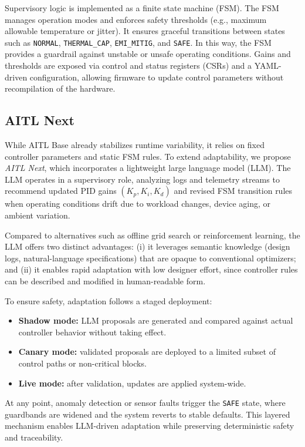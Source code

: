 \documentclass[conference]{IEEEtran}
\begin{document}
Supervisory logic is implemented as a finite state machine (FSM). The FSM manages operation modes and enforces safety thresholds (e.g., maximum allowable temperature or jitter). It ensures graceful transitions between states such as \texttt{NORMAL}, \texttt{THERMAL\_CAP}, \texttt{EMI\_MITIG}, and \texttt{SAFE}. In this way, the FSM provides a guardrail against unstable or unsafe operating conditions. Gains and thresholds are exposed via control and status registers (CSRs) and a YAML-driven configuration, allowing firmware to update control parameters without recompilation of the hardware.

\subsection{AITL Next}
While AITL Base already stabilizes runtime variability, it relies on fixed controller parameters and static FSM rules. To extend adaptability, we propose \emph{AITL Next}, which incorporates a lightweight large language model (LLM). The LLM operates in a supervisory role, analyzing logs and telemetry streams to recommend updated PID gains $(K_p,K_i,K_d)$ and revised FSM transition rules when operating conditions drift due to workload changes, device aging, or ambient variation.

Compared to alternatives such as offline grid search or reinforcement learning, the LLM offers two distinct advantages:  
(i) it leverages semantic knowledge (design logs, natural-language specifications) that are opaque to conventional optimizers; and  
(ii) it enables rapid adaptation with low designer effort, since controller rules can be described and modified in human-readable form.  

To ensure safety, adaptation follows a staged deployment:
\begin{itemize}
  \item \textbf{Shadow mode:} LLM proposals are generated and compared against actual controller behavior without taking effect.
  \item \textbf{Canary mode:} validated proposals are deployed to a limited subset of control paths or non-critical blocks.
  \item \textbf{Live mode:} after validation, updates are applied system-wide.
\end{itemize}
At any point, anomaly detection or sensor faults trigger the \texttt{SAFE} state, where guardbands are widened and the system reverts to stable defaults. This layered mechanism enables LLM-driven adaptation while preserving deterministic safety and traceability.
\end{document}

